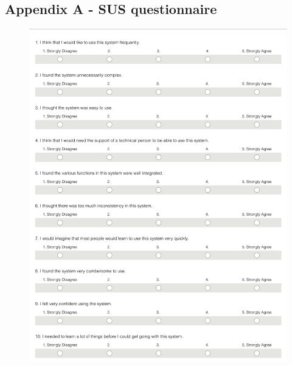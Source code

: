 \documentclass[version=last,fontsize=13pt]{scrartcl}
\begin{document}
\begin{appendices}

	\section{Appendix A - SUS questionnaire}

	\begin{figure}[H]

		\includegraphics[scale = 1] {./imgs/sus}

	\end{figure}



\end{appendices}
\end{document}
